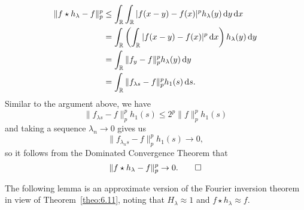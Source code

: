 \begin{pf}
    \begin{align*}
        \|f \star h_\lambda - f\|_p^p 
        &\leq \int_{\mathbb{R}} \int_{\mathbb{R}} |f(x-y) - f(x)|^p h_\lambda(y)\,\mathrm{d} y \,\mathrm{d} x \\ 
        &= \int_{\mathbb{R}} \left( \int_{\mathbb{R}} |f(x-y) - f(x)|^p \,\mathrm{d} x \right) h_\lambda(y) \,\mathrm{d} y \\ 
        &= \int_{\mathbb{R}} \|f_y - f\|_p^p h_\lambda(y)\,\mathrm{d} y \\ 
        &= \int_{\mathbb{R}} \|f_{\lambda s} - f\|_p^p h_1(s)\,\mathrm{d} s. 
    \end{align*}
    Similar to the argument above, we have 
    \[ \|f_{\lambda s} - f\|_p^p h_1(s) \leq 2^p \|f\|_p^p h_1(s) \] 
    and taking a sequence $\lambda_n \to 0$ gives us
    \[ \|f_{\lambda_n s} - f\|_p^p h_1(s) \to 0, \] 
    so it follows from the Dominated Convergence Theorem that 
    \[ \|f \star h_\lambda - f\|_p^p \to 0. \qedhere \] 
\end{pf}

The following lemma is an approximate version of the Fourier inversion theorem 
in view of Theorem~\ref{theo:6.11}, noting that $H_\lambda \approx 1$ and 
$f \star h_\lambda \approx f$. 

